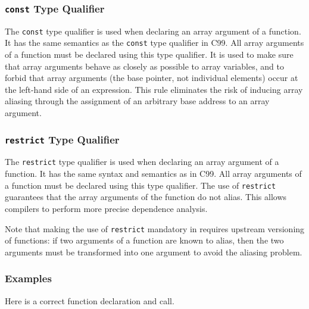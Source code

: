\subsubsection{\texttt{const} Type Qualifier}
\label{sec:const}

The \lstinline!const! type qualifier is used when declaring an array argument of a \pencil function.
It
has the same semantics as the \lstinline!const! type qualifier in C99.
All array arguments of a \pencil function
must be declared using this type qualifier.
It is used to make sure that array arguments behave as closely as possible to
array variables, and to forbid that array arguments (the base
pointer, not individual elements) occur at the left-hand side of an
expression.  This rule eliminates the risk of inducing array aliasing
through the assignment of an arbitrary base address to an array
argument.

\subsubsection{\texttt{restrict} Type Qualifier}
\label{sec:restrict}



The \lstinline!restrict! type qualifier is used when declaring an array argument of a \pencil function.
  It has the same syntax and semantics
  as in C99.
  All array arguments of a \pencil function
  must be declared using this type qualifier.
  The use of \lstinline!restrict! guarantees that the array
  arguments of the function do not alias.
  This allows \pencil compilers to
  perform more precise dependence analysis.
  
  Note that making the use of \lstinline!restrict! mandatory in \pencil requires
  upstream versioning of functions: if two arguments of a function are known
  to alias, then the two arguments must be transformed into one argument to
  avoid the aliasing problem.

\subsubsection*{Examples}

Here is a correct \pencil function declaration and call.

